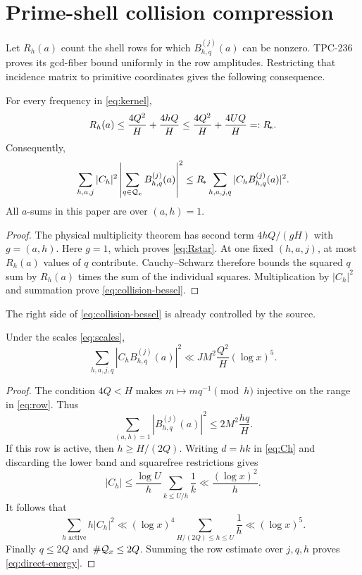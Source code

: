 \section{Prime-shell collision compression}

Let $R_h(a)$ count the shell rows for which
$B_{h,q}^{(j)}(a)$ can be nonzero.  TPC-236 proves its gcd-fiber bound uniformly in
the row amplitudes.  Restricting that incidence matrix to primitive coordinates gives
the following consequence.

\begin{lemma}\label{lem:collision}
For every frequency in \eqref{eq:kernel},
\begin{equation}
 R_h(a)\le \frac{4Q^2}{H}+\frac{4hQ}{H}
          \le \frac{4Q^2}{H}+\frac{4UQ}{H}=:R_{\!*}.  \label{eq:Rstar}
\end{equation}
Consequently,
\begin{equation}
 \sum_{h,a,j}|C_h|^2
 \left|\sum_{q\in\mathcal Q_x}B_{h,q}^{(j)}(a)\right|^2
 \le R_{\!*}
 \sum_{h,a,j,q}|C_hB_{h,q}^{(j)}(a)|^2.              \label{eq:collision-bessel}
\end{equation}
All $a$-sums in this paper are over $(a,h)=1$.
\end{lemma}

\begin{proof}
The physical multiplicity theorem has second term $4hQ/(gH)$ with $g=(a,h)$.
Here $g=1$, which proves \eqref{eq:Rstar}.  At one fixed $(h,a,j)$, at most
$R_h(a)$ values of $q$ contribute.  Cauchy--Schwarz therefore bounds the squared
$q$ sum by $R_h(a)$ times the sum of the individual squares.  Multiplication by
$|C_h|^2$ and summation prove \eqref{eq:collision-bessel}.
\end{proof}

The right side of \eqref{eq:collision-bessel} is already controlled by the source.

\begin{lemma}\label{lem:direct}
Under the scales \eqref{eq:scales},
\begin{equation}
 \sum_{h,a,j,q}|C_hB_{h,q}^{(j)}(a)|^2
 \ll JM^2\frac{Q^2}{H}(\log x)^5.                    \label{eq:direct-energy}
\end{equation}
\end{lemma}

\begin{proof}
The condition $4Q<H$ makes $m\mapsto mq^{-1}\pmod h$ injective on the range in
\eqref{eq:row}.  Thus
\[
 \sum_{(a,h)=1}|B_{h,q}^{(j)}(a)|^2
 \le 2M^2\frac{hq}{H}.
\]
If this row is active, then $h\ge H/(2Q)$.  Writing $d=hk$ in \eqref{eq:Ch} and
discarding the lower band and squarefree restrictions gives
\[
 |C_h|\le\frac{\log U}{h}\sum_{k\le U/h}\frac1k
 \ll\frac{(\log x)^2}{h}.
\]
It follows that
\[
 \sum_{h\text{ active}}h|C_h|^2
 \ll(\log x)^4\sum_{H/(2Q)\le h\le U}\frac1h
 \ll(\log x)^5.
\]
Finally $q\le2Q$ and $\#\mathcal Q_x\le2Q$.  Summing the row estimate over $j,q,h$ proves
\eqref{eq:direct-energy}.
\end{proof}
